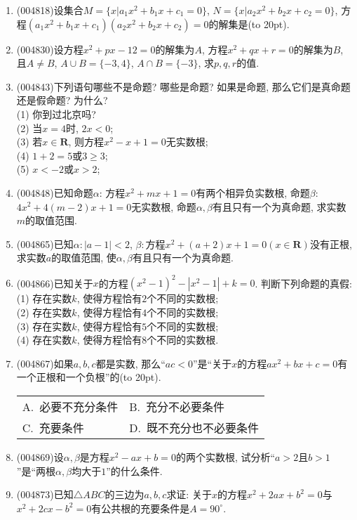 \documentclass[10pt,a4paper]{article}
\newcommand{\blank}[1]{\underline{\hbox to #1pt{}}}
\newcommand{\bracket}[1]{(\hbox to #1pt{})}
\newcommand{\twoch}[4]{\par\begin{tabular}{p{.46\textwidth}p{.46\textwidth}}
A.~#1& B.~#2\\
C.~#3& D.~#4
\end{tabular}}
\begin{document}
\begin{enumerate}[1.]
(3) $\{y|y=x^2-1, \ |x|\le 2, \ x\in \mathbf{Z}\}$:\blank{50};\\
(4) $\{(x,y)|y =x^2-1, \  |x|\le 2,\ x\in \mathbf{Z}\}$:\blank{50};\\
(5) $\{(x,y)|x+y=5, \ x\in \mathbf{N},\ y\in \mathbf{Z}\}$:\blank{50}.
\item {\tiny (004818)}设集合$M=\{x|a_1x^2+b_1x+c_1=0\}$, $N=\{x|a_2x^2+b_2x+c_2=0\}$, 方程$(a_1x^2+b_1x+c_1)(a_2x^2+b_2x+c_2)=0$的解集是\bracket{20}.
\item {\tiny (004830)}设方程$x^2+px-12=0$的解集为$A$, 方程$x^2+qx+r=0$的解集为$B$, 且$A\ne B$, $A\cup B=\{-3,4\}$, $A\cap B=\{-3\}$, 求$p,q,r$的值.
\item {\tiny (004843)}下列语句哪些不是命题? 哪些是命题? 如果是命题, 那么它们是真命题还是假命题? 为什么?\\
(1) 你到过北京吗?\\
(2) 当$x=4$时, $2x<0$;\\
(3) 若$x\in \mathbf{R}$, 则方程$x^2-x+1=0$无实数根;\\
(4) $1+2=5$或$3\ge 3$;\\
(5) $x<-2$或$x>2$;\\
\item {\tiny (004848)}已知命题$\alpha$: 方程$x^2+mx+1=0$有两个相异负实数根, 命题$\beta$: $4x^2+4(m-2)x+1=0$无实数根, 命题$\alpha,\beta$有且只有一个为真命题, 求实数$m$的取值范围.
\item {\tiny (004865)}已知$\alpha :|a-1|<2$, $\beta:$方程$x^2+(a+2)x+1=0(x\in \mathbf{R})$没有正根, 求实数$a$的取值范围, 使$\alpha,\beta$有且只有一个为真命题.
\item {\tiny (004866)}已知关于$x$的方程$(x^2-1)^2-|x^2-1|+k=0$. 判断下列命题的真假:\\
(1) 存在实数$k$, 使得方程恰有$2$个不同的实数根;\\
(2) 存在实数$k$, 使得方程恰有$4$个不同的实数根;\\
(3) 存在实数$k$, 使得方程恰有$5$个不同的实数根;\\
(4) 存在实数$k$, 使得方程恰有$8$个不同的实数根.
\item {\tiny (004867)}如果$a,b,c$都是实数, 那么``$ac<0$''是``关于$x$的方程$ax^2+bx+c=0$有一个正根和一个负根''的\bracket{20}.
\twoch{必要不充分条件}{充分不必要条件}{充要条件}{既不充分也不必要条件}
\item {\tiny (004869)}设$\alpha ,\beta$是方程$x^2-ax+b=0$的两个实数根, 试分析``$a>2$且$b>1$''是``两根$\alpha ,\beta$均大于$1$''的什么条件.
\item {\tiny (004873)}已知$\triangle ABC$的三边为$a,b,c$求证: 关于$x$的方程$x^2+2ax+b^2=0$与$x^2+2cx-b^2=0$有公共根的充要条件是$A=90^\circ$.

\end{enumerate}
\end{document}
